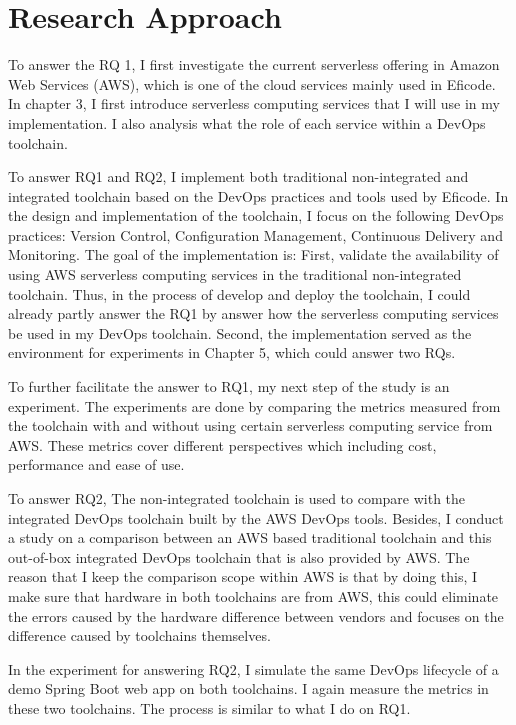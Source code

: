\section{Research Approach} 
\par
To answer the RQ 1, I first investigate the current serverless offering in Amazon Web Services (AWS), which is one of the cloud services mainly used in Eficode. In chapter 3, I first introduce serverless computing services that I will use in my implementation. I also analysis what the role of each service within a DevOps toolchain.
\par
To answer RQ1 and RQ2, I implement both traditional non-integrated and integrated toolchain based on the DevOps practices and tools used by Eficode. In the design and implementation of the toolchain, I focus on the following DevOps practices: Version Control, Configuration Management, Continuous Delivery and Monitoring. The goal of the implementation is: First, validate the availability of using AWS serverless computing services in the traditional non-integrated toolchain. Thus, in the process of develop and deploy the toolchain, I could already partly answer the RQ1 by answer how the serverless computing services be used in my DevOps toolchain. Second, the implementation served as the environment for experiments in Chapter 5, which could answer two RQs.
\par
To further facilitate the answer to RQ1, my next step of the study is an experiment.
The experiments are done by comparing the metrics measured from the toolchain with and without using certain serverless computing service from AWS. These metrics cover different perspectives which including cost, performance and ease of use. 
\par
To answer RQ2, The non-integrated toolchain is used to compare with the integrated DevOps toolchain built by the AWS DevOps tools.
Besides, I conduct a study on a comparison between an AWS based traditional toolchain and this out-of-box integrated DevOps toolchain that is also provided by AWS. The reason that I keep the comparison scope within AWS is that by doing this, I make sure that hardware in both toolchains are from AWS, this could eliminate the errors caused by the hardware difference between vendors and focuses on the difference caused by toolchains themselves.
\par
In the experiment for answering RQ2, I simulate the same DevOps lifecycle of a demo Spring Boot web app on both toolchains. I again measure the metrics in these two toolchains. The process is similar to what I do on RQ1.
